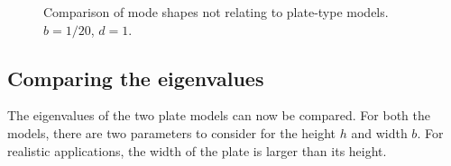 \documentclass[../../main.tex]{subfiles}
\begin{document}
\begin{figure}[h!]
	\caption{Comparison of mode shapes not relating to plate-type models. $b = 1/20$, $d = 1$.}
\end{figure} \label{fig:non_plate_mode_shapes}


\subsection{Comparing the eigenvalues}
The eigenvalues of the two plate models can now be compared. For both the models, there are two parameters to consider for the height $h$ and width $b$. For realistic applications, the width of the plate is larger than its height. 
\end{document}
